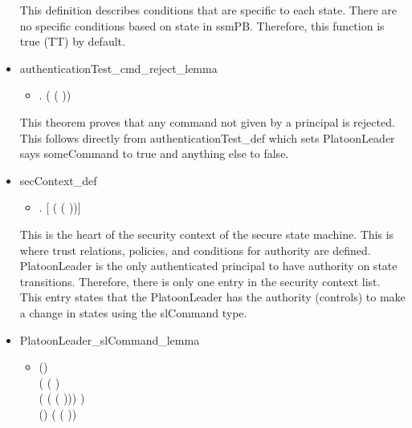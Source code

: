 \begin{itemize}
    This definition describes conditions that are specific to each state. There are
    no specific conditions based on state in ssmPB. Therefore, this function is true (TT) by default.
  \item authenticationTest_cmd_reject_lemma
    \begin{itemize}
    \item[] \HOLTokenTurnstile{} \HOLSymConst{\HOLTokenForall{}}. \HOLSymConst{\HOLTokenNeg{}} ( ( ))
    \end{itemize}
    This theorem proves that any command not given by a principal is rejected. This
    follows directly from authenticationTest_def which sets PlatoonLeader says someCommand to
    true and anything else to false.
  \item secContext_def
    \begin{itemize}
    \item[] \HOLTokenTurnstile{} \HOLSymConst{\HOLTokenForall{}}.
       \HOLSymConst{=}
     [    ( ( ))]
   \end{itemize}
   This is the heart of the security context of the secure state machine. This is
   where trust relations, policies, and conditions for authority are defined.
   PlatoonLeader is the only authenticated principal to have authority on state
   transitions. Therefore, there is only one entry in the security context list.
   This entry states that the PlatoonLeader has the authority (controls) to make a
   change in states using the slCommand type.
 \item PlatoonLeader_slCommand_lemma
   \begin{itemize}
    \item[] \HOLTokenTurnstile{}  (\HOLSymConst{,}\HOLSymConst{,})\\
     (   ( )\\
        (    ( ( ))\HOLSymConst{::}) 
        ) \HOLSymConst{\HOLTokenImp{}}\\
   (\HOLSymConst{,}\HOLSymConst{,})   ( ( ))

\end{itemize}
\end{itemize}
